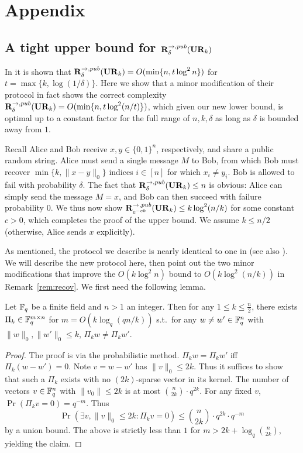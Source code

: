 \section{Appendix}

\subsection{A tight upper bound for $\mathbf{R}^{\rightarrow,pub}_\delta(\mathbf{UR}_k)$}

In \cite[Proposition 1]{JowhariST11} it is shown that $\mathbf{R}^{\rightarrow,pub}_\delta(\mathbf{UR}_k) = O(\min\{n,t\log^2 n\})$ for $t = \max\{k,\log(1/\delta)\}$. Here we show that a minor modification of their protocol in fact shows the correct complexity $\mathbf{R}^{\rightarrow,pub}_\delta(\mathbf{UR}_k) = O(\min\{n,t\log^2(n/t)\})$, which given our new lower bound, is optimal up to a constant factor for the full range of $n,k,\delta$ as long as $\delta$ is bounded away from $1$.

Recall Alice and Bob receive $x, y\in\{0,1\}^n$, respectively, and share a public random string. Alice must send a single message $M$ to Bob, from which Bob must recover $\min\{k, \|x-y\|_0\}$ indices $i\in[n]$ for which $x_i\neq y_i$. Bob is allowed to fail with probability $\delta$. The fact that $\mathbf{R}^{\rightarrow,pub}_\delta(\mathbf{UR}_k) \le n$ is obvious: Alice can simply send the message $M = x$, and Bob can then succeed with failure probability $0$. We thus now show $\mathbf{R}^{\rightarrow,pub}_{e^{-ck}}(\mathbf{UR}_k) \le k\log^2(n/k)$ for some constant $c>0$, which completes the proof of the upper bound. We assume $k\le n/2$ (otherwise, Alice sends $x$ explicitly).

As mentioned, the protocol we describe is nearly identical to one in \cite{JowhariST11} (see also \cite{CormodeF14}). We will describe the new protocol here, then point out the two minor modifications that improve the $O(k\log^2 n)$ bound to $O(k\log^2(n/k))$ in Remark~\ref{rem:recov}. We first need the following lemma.

\begin{lemma}\label{lem:sparse-recov}
Let $\mathbb{F}_q$ be a finite field and $n>1$ an integer. Then for any $1\le k\le \frac n2$, there exists $\Pi_k\in \mathbb{F}_q^{m\times n}$ for $m = O(k\log_q(qn/k))$ s.t.\ for any $w\neq w'\in\mathbb{F}_q^n$ with $\|w\|_0, \|w'\|_0 \le k$, $\Pi_k w \neq \Pi_k w'$.
\end{lemma}
\begin{proof}
The proof is via the probabilistic method. $\Pi_k w = \Pi_k w'$ iff $\Pi_k (w - w') = 0$. Note $v = w-w'$ has $\|v\|_0 \le 2k$. Thus it suffices to show that such a $\Pi_k$ exists with no $(2k)$-sparse vector in its kernel. The number of vectors $v\in\mathbb{F}_q^n$ with $\|v_0\| \le 2k$ is at most $\binom{n}{2k}\cdot q^{2k}$. For any fixed $v$, $\Pr(\Pi_k v = 0) = q^{-m}$. Thus 
$$\Pr(\exists v, \|v\|_0 \le 2k: \Pi_k v = 0) \le \binom{n}{2k}\cdot q^{2k} \cdot q^{-m}$$ 
by a union bound. The above is strictly less than $1$ for $m > 2k + \log_q\binom{n}{2k}$, yielding the claim.
\end{proof}

